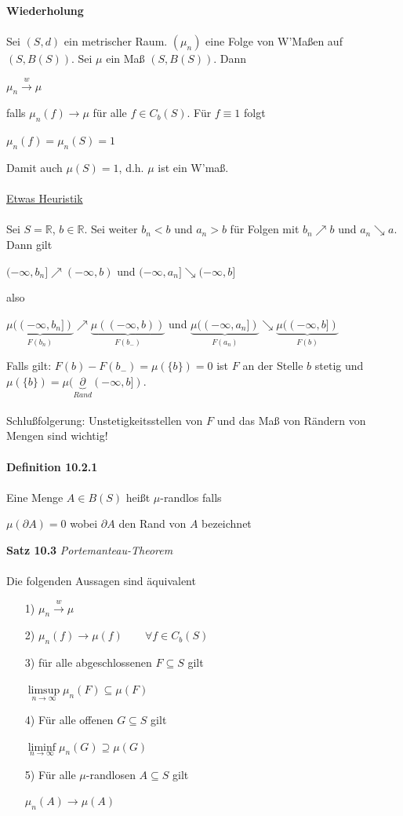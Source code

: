 \documentclass[10pt,a4paper]{report}
\newcommand{\R}{\mathbb{R}}
\numberwithin{equation}{section}
\numberwithin{figure}{section}
\theoremstyle{plain}
\theoremstyle{definition}
\theoremstyle{plain}
\theoremstyle{definition}
\theoremstyle{remark}
\theoremstyle{plain}
\theoremstyle{plain}
\theoremstyle{plain}
\newcommand{\1}{ \mathbb{1} } %
\begin{document}
\textbf{Wiederholung}\\\\
Sei $(S,d)$ ein metrischer Raum. $(\mu_n)$ eine Folge von W'Maßen auf $(S,B(S))$. Sei $\mu$ ein Maß $(S,B(S))$. Dann
\begin{center}
$\mu_n \overset{w}{\to} \mu$
\end{center}
falls $\mu_n(f) \to \mu$ für alle $f \in C_b(S)$. Für $f \equiv 1$ folgt
\begin{center}
$\mu_n(f)=\mu_n(S)=1$
\end{center}
Damit auch $\mu(S)=1$, d.h. $\mu$ ist ein W'maß.\\\\
\underline{Etwas Heuristik}\\\\
Sei $S=\R$, $b \in \R$. Sei weiter $b_n <b$ und $a_n>b$ für Folgen mit $b_n\nearrow b$ und $a_n \searrow a$. Dann gilt
\begin{center}
$(-\infty,b_n] \nearrow (-\infty,b)$ und $(-\infty,a_n] \searrow (-\infty,b]$
\end{center}
also 
\begin{center}
$\underbrace{\mu((-\infty,b_n])}_{F(b_n)} \nearrow \underbrace{\mu((-\infty,b))}_{F(b_-)}$ und $\underbrace{\mu((-\infty,a_n])}_{F(a_n)} \searrow \underbrace{\mu((-\infty,b])}_{F(b)}$
\end{center}
Falls gilt: $F(b)-F(b_-)=\mu(\{b\})=0$ ist $F$ an der Stelle $b$ stetig und $\mu(\{b\})=\mu(\underbrace{\partial}_{Rand}(-\infty,b])$.\\\\
Schlußfolgerung: Unstetigkeitsstellen von $F$ und das Maß von Rändern von Mengen sind wichtig!\\\\
\textbf{Definition 10.2.1}\\\\
Eine Menge $A \in B(S)$ heißt $\mu$-randlos falls
\begin{center}
$\mu(\partial A)=0$ wobei $\partial A$ den Rand von $A$ bezeichnet
\end{center}
\textbf{Satz 10.3} \textit{Portemanteau-Theorem}\\\\
Die folgenden Aussagen sind äquivalent
\begin{itemize}
\item[1)] $\mu_n \overset{w}{\to} \mu$
\item[2)] $\mu_n(f) \to \mu(f) \qquad \forall f \in C_b(S)$
\item[3)] für alle abgeschlossenen $F \subseteq S$ gilt
\begin{center}
$\limsup\limits_{n \to \infty} \mu_n(F) \subseteq \mu(F)$
\end{center}  
\item[4)] Für alle offenen $G \subseteq S$ gilt
\begin{center}
$\liminf\limits_{n \to \infty}\mu_n(G) \supseteq \mu(G)$
\end{center}
\item[5)] Für alle $\mu$-randlosen $A \subseteq S$ gilt
\begin{center}
$\mu_n(A) \to \mu(A)$
\end{center}
\end{itemize}
\end{document}

